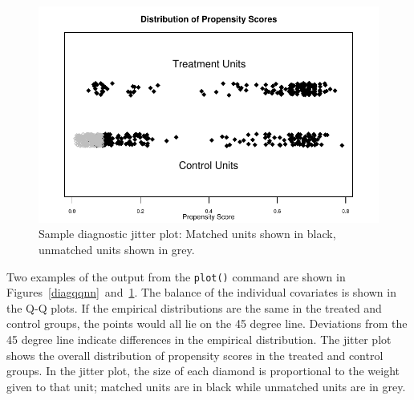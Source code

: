 \begin{figure}[tbp]
  \begin{center}
    \includegraphics{figs/jitterplotnn}
    \hfill
    \caption{Sample diagnostic jitter plot: Matched units shown in
      black, unmatched units shown in grey.}
    \label{diagjitternn}
  \end{center}
\end{figure}

Two examples of the output from the {\tt plot()} command are shown in
Figures~\ref{diagqqnn}~and~\ref{diagjitternn}. The balance of the
individual covariates is shown in the Q-Q plots.  If the empirical
distributions are the same in the treated and control groups, the
points would all lie on the 45 degree line.  Deviations from the 45
degree line indicate differences in the empirical distribution.  The
jitter plot shows the overall distribution of propensity scores in the
treated and control groups.  In the jitter plot, the size of each
diamond is proportional to the weight given to that unit; matched
units are in black while unmatched units are in grey.  

